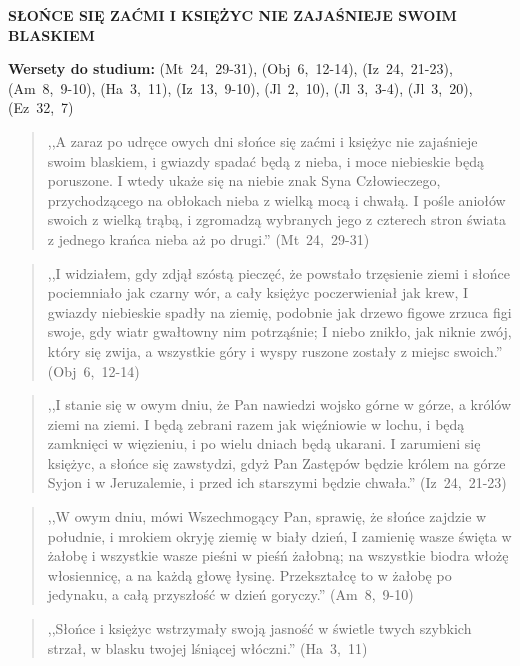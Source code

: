 \documentclass[10pt,a4paper,oneside]{article}
\begin{document}
\centerline{\textbf{\MakeUppercase{Słońce się zaćmi i księżyc nie zajaśnieje swoim blaskiem}}}
\begin{center}
\textbf{Wersety do studium:} \mbox{(Mt 24, 29-31)}, \mbox{(Obj 6, 12-14)}, \mbox{(Iz 24, 21-23)}, \mbox{(Am 8, 9-10)}, \mbox{(Ha 3, 11)}, \mbox{(Iz 13, 9-10)}, \mbox{(Jl 2, 10)}, \mbox{(Jl 3, 3-4)}, \mbox{(Jl 3, 20)}, \mbox{(Ez 32, 7)}
\end{center}
\begin{quote}
,,A zaraz po udręce owych dni słońce się zaćmi i księżyc nie zajaśnieje swoim blaskiem, i gwiazdy spadać będą z nieba, i moce niebieskie będą poruszone. I wtedy ukaże się na niebie znak Syna Człowieczego, przychodzącego na obłokach nieba z wielką mocą i chwałą. I pośle aniołów swoich z wielką trąbą, i zgromadzą wybranych jego z czterech stron świata z jednego krańca nieba aż po drugi.'' \mbox{(Mt 24, 29-31)}
\end{quote}
\begin{quote}
,,I widziałem, gdy zdjął szóstą pieczęć, że powstało trzęsienie ziemi i słońce pociemniało jak czarny wór, a cały księżyc poczerwieniał jak krew, I gwiazdy niebieskie spadły na ziemię, podobnie jak drzewo figowe zrzuca figi swoje, gdy wiatr gwałtowny nim potrząśnie; I niebo znikło, jak niknie zwój, który się zwija, a wszystkie góry i wyspy ruszone zostały z miejsc swoich.'' \mbox{(Obj 6, 12-14)}
\end{quote}
\begin{quote}
,,I stanie się w owym dniu, że Pan nawiedzi wojsko górne w górze, a królów ziemi na ziemi. I będą zebrani razem jak więźniowie w lochu, i będą zamknięci w więzieniu, i po wielu dniach będą ukarani. I zarumieni się księżyc, a słońce się zawstydzi, gdyż Pan Zastępów będzie królem na górze Syjon i w Jeruzalemie, i przed ich starszymi będzie chwała.'' \mbox{(Iz 24, 21-23)}
\end{quote}
\begin{quote}
,,W owym dniu, mówi Wszechmogący Pan, sprawię, że słońce zajdzie w południe, i mrokiem okryję ziemię w biały dzień, I zamienię wasze święta w żałobę i wszystkie wasze pieśni w pieśń żałobną; na wszystkie biodra włożę włosiennicę, a na każdą głowę łysinę. Przekształcę to w żałobę po jedynaku, a całą przyszłość w dzień goryczy.'' \mbox{(Am 8, 9-10)}
\end{quote}
\begin{quote}
,,Słońce i księżyc wstrzymały swoją jasność w świetle twych szybkich strzał, w blasku twojej lśniącej włóczni.'' \mbox{(Ha 3, 11)}
\end{quote}
\end{document}
